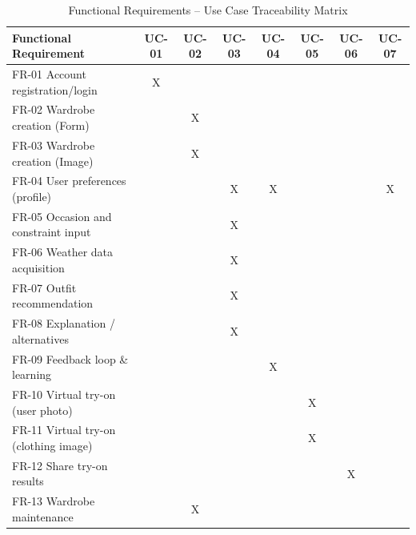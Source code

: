 \begin{table}[H]
\centering
\caption{Functional Requirements -- Use Case Traceability Matrix}
\label{tab:fr_uc_matrix}
\small
\setlength{\tabcolsep}{3pt}
\begin{tabular}{p{4cm} | c c c c c c c}
\toprule
\textbf{Functional Requirement} &
\textbf{UC-01} &
\textbf{UC-02} &
\textbf{UC-03} &
\textbf{UC-04} &
\textbf{UC-05} &
\textbf{UC-06} &
\textbf{UC-07} \\
\midrule
FR-01 Account registration/login                 & X &   &   &   &   &   &   \\
FR-02 Wardrobe creation (Form)                   &   & X &   &   &   &   &   \\
FR-03 Wardrobe creation (Image)                  &   & X &   &   &   &   &   \\
FR-04 User preferences (profile)                 &   &   & X & X &   &   & X \\
FR-05 Occasion and constraint input              &   &   & X &   &   &   &   \\
FR-06 Weather data acquisition                   &   &   & X &   &   &   &   \\
FR-07 Outfit recommendation                      &   &   & X &   &   &   &   \\
FR-08 Explanation / alternatives                 &   &   & X &   &   &   &   \\
FR-09 Feedback loop \& learning                  &   &   &   & X &   &   &   \\
FR-10 Virtual try-on (user photo)                &   &   &   &   & X &   &   \\
FR-11 Virtual try-on (clothing image)            &   &   &   &   & X &   &   \\
FR-12 Share try-on results                       &   &   &   &   &   & X &   \\
FR-13 Wardrobe maintenance                       &   & X &   &   &   &   &   \\
\bottomrule
\end{tabular}
\end{table}




